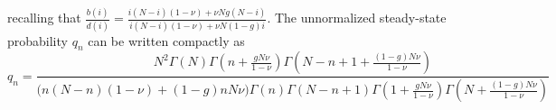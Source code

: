 recalling that $\frac{b(i)}{d(i)} = \frac{i(N-i)(1-\nu) + \nu Ng(N-i)}{i(N-i)(1-\nu) + \nu N(1-g)i}$.
%
The unnormalized steady-state probability $q_n$ can be written compactly as%
\begin{equation*}%
q_n = \frac{ N^2\Gamma(N) \Gamma\left(n+\frac{g N\nu}{1-\nu}\right) \Gamma\left(N-n+1+\frac{(1-g) N\nu}{1-\nu}\right) }{ \big(n(N-n)(1-\nu)+(1-g)n N\nu\big) \Gamma(n) \Gamma(N-n+1) \Gamma\left(1+\frac{g N\nu}{1-\nu}\right) \Gamma\left(N+\frac{(1-g) N\nu}{1-\nu}\right)}
\end{equation*}
